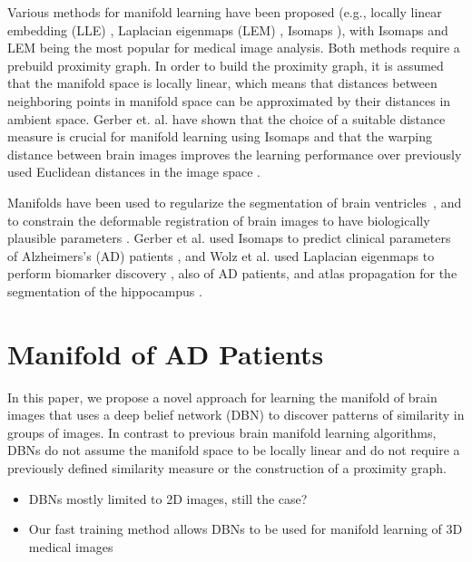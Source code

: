 
Various methods for manifold learning have been proposed (e.g., locally linear
embedding (LLE) \citep{saul2003}, Laplacian eigenmaps (LEM) \citep{belkin2002},
Isomaps \citep{tenenbaum2000}), with Isomaps and LEM being the most popular for
medical image analysis. Both methods require a prebuild proximity graph. In
order to build the proximity graph, it is assumed that the manifold space is
locally linear, which means that distances between neighboring points in
manifold space can be approximated by their distances in ambient space. Gerber
et. al. have shown that the choice of a suitable distance measure is crucial for
manifold learning using Isomaps and that the warping distance between brain
images improves the learning performance over previously used Euclidean
distances in the image space \citep{gerber2010}.

Manifolds have been used to regularize the segmentation of brain
ventricles~\citep{etyngier2007}, and to constrain the deformable registration of
brain images to have biologically plausible parameters \citep{hamm2010}. Gerber
et al. used Isomaps to predict clinical parameters of Alzheimers's (AD) patients
\citep{gerber2010}, and Wolz et al. used Laplacian eigenmaps to perform
biomarker discovery \citep{wolz2011}, also of AD patients, and atlas propagation
for the segmentation of the hippocampus \citep{wolz2010}.

\section{Manifold of AD Patients}


In this paper, we propose a novel approach for learning the manifold of brain
images that uses a deep belief network (DBN) \cite{Hinton2006b} to discover
patterns of similarity in groups of images. In contrast to previous
brain manifold learning algorithms, DBNs do not assume the manifold
space to be locally linear and do not require a previously defined similarity
measure or the construction of a proximity graph.
\begin{itemize}
\item DBNs mostly limited to 2D images, still the case?
\item Our fast training method allows DBNs to be used for manifold learning of
3D medical images
\end{itemize}

